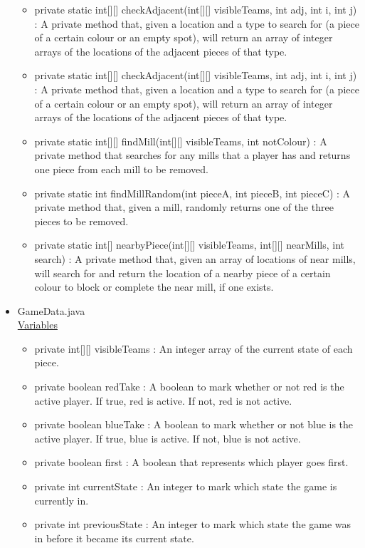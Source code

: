 \documentclass[12pt]{article}
\begin{document}
\begin{itemize}
\begin{itemize}
			\item private static int[][] checkAdjacent(int[][] visibleTeams, int adj, int i, int j) : A private method that, given a location and a type to search for (a piece of a certain colour or an empty spot), will return an array of integer arrays of the locations of the adjacent pieces of that type.
			\item private static int[][] checkAdjacent(int[][] visibleTeams, int adj, int i, int j) : A private method that, given a location and a type to search for (a piece of a certain colour or an empty spot), will return an array of integer arrays of the locations of the adjacent pieces of that type.
			\item private static int[][] findMill(int[][] visibleTeams, int notColour) : A private method that searches for any mills that a player has and returns one piece from each mill to be removed.
			\item private static int findMillRandom(int pieceA, int pieceB, int pieceC) : A private method that, given a mill, randomly returns one of the three pieces to be removed.
			\item private static int[] nearbyPiece(int[][] visibleTeams, int[][] nearMills, int search) : A private method that, given an array of locations of near mills, will search for and return the location of a nearby piece of a certain colour to block or complete the near mill, if one exists.
		\end{itemize}
		\item GameData.java \\
		\underline{Variables}
		\begin{itemize}
			\item private int[][] visibleTeams : An integer array of the current state of each piece.
			\item private boolean redTake : A boolean to mark whether or not red is the active player. If true, red is active. If not, red is not active.
			\item private boolean blueTake : A boolean to mark whether or not blue is the active player. If true, blue is active. If not, blue is not active.
			\item private boolean first : A boolean that represents which player goes first.
			\item private int currentState : An integer to mark which state the game is currently in.
			\item private int previousState : An integer to mark which state the game was in before it became its current state.

\end{itemize}
\end{itemize}
\end{document}
